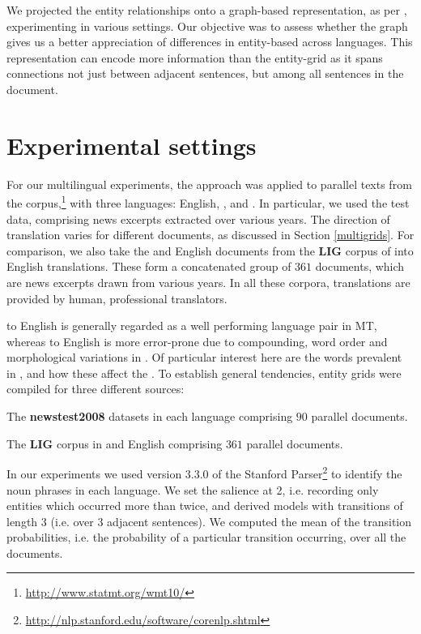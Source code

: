 \documentclass[output=paper]{langsci/langscibook.cls}
\begin{document}
We projected the entity relationships onto a graph-based representation, as per \citet{Guinaudeau}, experimenting in various settings. Our objective was to assess whether the graph gives us a better appreciation of differences in entity-based  across languages.
This representation can encode more information than the entity-grid as it spans connections not just between adjacent sentences, but among all sentences in the document. 


\section{Experimental settings}\label{multi:exp}

For our multilingual experiments, the  approach was applied to parallel texts from the  corpus,\footnote{\url{http://www.statmt.org/wmt10/}} with three languages: English, , and . In particular, we used the test data, comprising news excerpts extracted over various years. The direction of translation varies for different documents, as discussed in Section \ref{multigrids}. 
For comparison, we also take the  and English documents from the {\bf LIG} corpus \citep{Potet:2012} of  into English translations. These form a concatenated group of $361$ documents, which are news excerpts drawn from various  years. In all these corpora, translations are provided by human, professional translators. 

 to English is generally regarded as a well performing language pair in MT, whereas  to English is more error-prone due to compounding, word order and morphological variations in . Of particular interest here are the  words prevalent in , and how these affect the . 
To establish general tendencies, entity grids were compiled for three different sources: 
\begin{compactitem}
 \item The {\bf newstest2008} datasets in each language comprising $90$ parallel documents. 

  \item The {\bf LIG} corpus in  and English comprising $361$ parallel documents.
\end{compactitem}

In our experiments we used version 3.3.0 of the Stanford Parser\footnote{\url{http://nlp.stanford.edu/software/corenlp.shtml}} to identify the noun phrases in each language. 
We set the salience at 2, i.e. recording only entities which occurred more than twice, and derived models with transitions of length %
$3$ (i.e. over %
3 adjacent sentences).
We computed the mean of the transition probabilities, i.e. the probability of a particular transition occurring, over all the documents.
\end{document}

